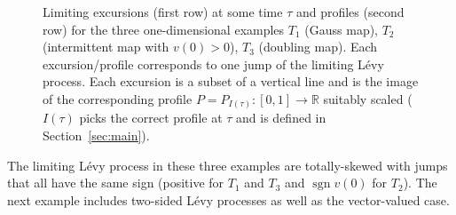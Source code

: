 \documentclass[12pt]{article}
\numberwithin{equation}{section}
\newcommand{\R}{{\mathbb R}}
\newcommand{\sgn}{\operatorname{sgn}}
\begin{document}
\begin{figure}[h]


\caption{Limiting excursions (first row) at some time $\tau$ and profiles (second row) for the three one-dimensional examples $T_1$ (Gauss map), $T_2$ (intermittent map with $v(0)>0$), $T_3$ (doubling map). Each excursion/profile corresponds to one jump of the limiting L\'evy process. Each excursion is a subset of a vertical line and is the image of the corresponding profile $P= P_{I(\tau)}:[0,1]\to\R$ suitably scaled ($I(\tau)$ picks the correct profile at $\tau$ and is defined in Section~\ref{sec:main}).}
\label{fig:M1}

\end{figure}

The limiting L\'evy process in these three examples are totally-skewed with jumps that all have the same sign (positive for $T_1$ and $T_3$ and $\sgn v(0)$ for $T_2$).  
The next example includes two-sided L\'evy processes as well as the vector-valued case.
\end{document}
